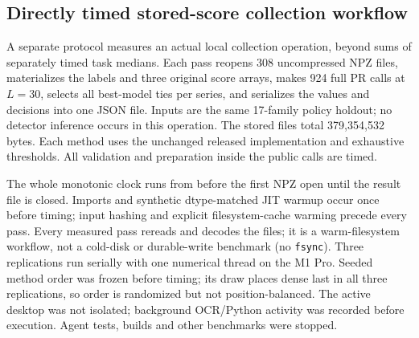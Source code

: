 \subsection{Directly timed stored-score collection workflow}
\label{sec:collection-workflow}
A separate protocol measures an actual local collection operation, beyond
sums of separately timed task medians. Each pass reopens 308 uncompressed
NPZ files, materializes the labels and three original score arrays, makes
924 full PR calls at $L=30$, selects all best-model ties per series, and
serializes the values and decisions into one JSON file. Inputs are the same
17-family policy holdout; no detector inference occurs in this operation.
The stored files total 379,354,532 bytes. Each method uses the unchanged
released implementation and exhaustive thresholds. All validation and
preparation inside the public calls are timed.

The whole monotonic clock runs from before the first NPZ open until the
result file is closed. Imports and synthetic dtype-matched JIT warmup occur
once before timing; input hashing and explicit filesystem-cache warming
precede every pass. Every measured
pass rereads and decodes the files; it is a warm-filesystem workflow, not a
cold-disk or durable-write benchmark (no \texttt{fsync}). Three replications
run serially with one numerical thread on the M1 Pro. Seeded method order
was frozen before timing; its draw places dense last in all three
replications, so order is randomized but not position-balanced. The active
desktop was not isolated; background OCR/Python activity was recorded before
execution. Agent tests, builds and other benchmarks were stopped.

